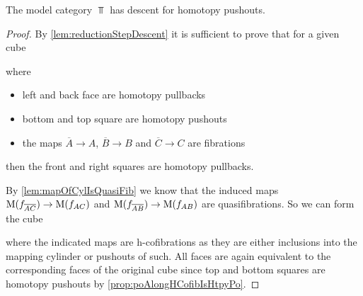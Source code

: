 \begin{prop}\label{lem:topDescentPoAlt}
    The model category $\Top$ has descent for homotopy pushouts. 
    \begin{proof}
        By \cref{lem:reductionStepDescent} it is sufficient to prove that for a given cube
        \begin{center}
        \end{center}
        where 
        \begin{itemize}
            \item left and back face are homotopy pullbacks
            \item bottom and top square are homotopy pushouts
            \item the maps $\overline{A}\to A$, $\overline{B}\to B$ and $\overline{C}\to C$ are fibrations
        \end{itemize}
        then the front and right squares are homotopy pullbacks.

        By \cref{lem:mapOfCylIsQuasiFib} we know that the induced maps $\operatorname{M}(f_{\overline{A}\overline{C}})\to\operatorname{M}(f_{AC})$ and $\operatorname{M}(f_{\overline{A}\overline{B}})\to\operatorname{M}(f_{AB})$ are quasifibrations.
        So we can form the cube 
        \begin{center}
        \end{center}
        where the indicated maps are h-cofibrations as they are either inclusions into the mapping cylinder or pushouts of such.
        All faces are again equivalent to the corresponding faces of the original cube since top and bottom squares are homotopy pushouts by \cref{prop:poAlongHCofibIsHtpyPo}.
        

\end{proof}
\end{prop}
